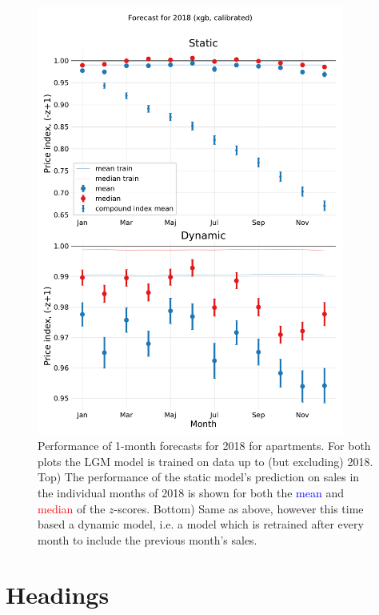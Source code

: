 \documentclass[a4paper, twoside, nobib]{tufte-book}
\begin{document}
\begin{figure}
  \includegraphics[width=0.9\textwidth, trim=0 0 0 70, clip]{figures/housing/Ejerlejlighed_v18_cut_all_Ncols_all_xgb_forecast_prediction_2018.pdf}
  \caption[2018 XGB Forecast]
          {Performance of 1-month forecasts for 2018 for apartments. For both plots the LGM model is trained on data up to (but excluding) 2018. Top) The performance of the static model's prediction on sales in the individual months of 2018 is shown for both the \textcolor{blue}{mean} and \textcolor{red}{median} of the $z$-scores. Bottom) Same as above, however this time based a dynamic model, i.e. a model which is retrained after every month to include the previous month's sales.
          } 
  \label{fig:h:forecast_2018_xgb}
\end{figure}









\section{Headings}\label{sec:headings1}
\end{document}
